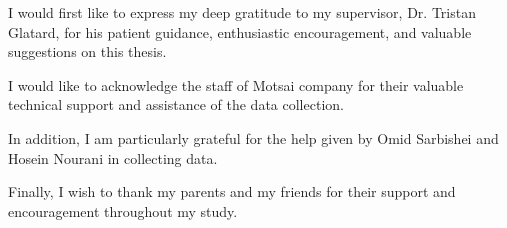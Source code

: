 \begin{acknowledgments}
I would first like to express my deep gratitude to my supervisor, Dr. Tristan
Glatard, for his patient guidance, enthusiastic encouragement, and valuable
suggestions on this thesis.
  
I would like to acknowledge the staff of Motsai company for their valuable
technical support and assistance of the data collection.
  
In addition, I am particularly grateful for the help given by Omid Sarbishei and
Hosein Nourani in collecting data.
  
Finally, I wish to thank my parents and my friends for their support and
encouragement throughout my study.
\end{acknowledgments}
